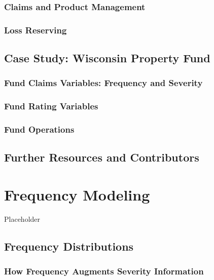 \documentclass[]{book}
\begin{document}
\subsection{Claims and Product
Management}\label{claims-and-product-management}

\subsection{Loss Reserving}\label{S:Reserving}

\section{Case Study: Wisconsin Property Fund}\label{S:LGPIF}

\subsection{Fund Claims Variables: Frequency and
Severity}\label{S:OutComes}

\subsection{Fund Rating Variables}\label{S:FundVariables}

\subsection{Fund Operations}\label{fund-operations}

\section{Further Resources and
Contributors}\label{Intro-further-reading-and-resources}

\chapter{Frequency Modeling}\label{C:Frequency-Modeling}

Placeholder

\section{Frequency Distributions}\label{S:frequency-distributions}

\subsection{How Frequency Augments Severity
Information}\label{S:how-frequency-augments-severity-information}
\end{document}
